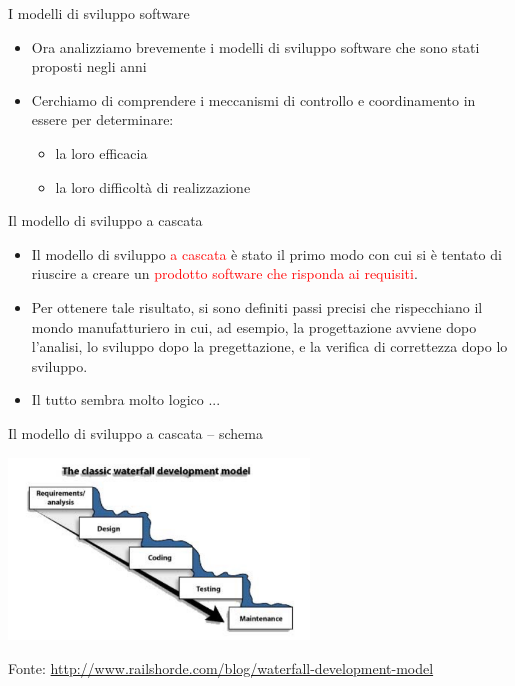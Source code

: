 \documentclass{beamer}
\begin{document}
\begin{frame}{\centerline{I modelli di sviluppo software}}

\begin{itemize}
\item Ora analizziamo brevemente i modelli di sviluppo software che sono stati proposti negli anni
\item Cerchiamo di comprendere i meccanismi di controllo e coordinamento in essere per determinare:
\begin{itemize}
\item la loro efficacia
\item la loro difficolt\`{a} di realizzazione 
\end{itemize}
\end{itemize}
\end{frame}


\begin{frame}{\centerline{Il modello di sviluppo a cascata}}


\begin{itemize}
    \item Il modello di sviluppo \textcolor{red}{a cascata} \`{e} stato il primo modo con cui si \`{e} tentato di riuscire a creare un \textcolor{red}{prodotto software che risponda ai requisiti}.
    \item Per ottenere tale risultato, si sono definiti passi precisi che rispecchiano il mondo manufatturiero in cui, ad esempio, la progettazione avviene dopo l'analisi, lo sviluppo dopo la pregettazione, e la verifica di correttezza dopo lo sviluppo.
\item Il tutto sembra molto logico ...
\end{itemize}


\end{frame}

\begin{frame}{\centerline{Il modello di sviluppo a cascata -- schema}}


\begin{center}
\includegraphics[width=80mm]{P2023.AIBCCSS.IlConcettoDiSoftware/img-02.png}
\end{center}
\vspace{0.5cm}

\begin{center}
\tiny
Fonte: \url{http://www.railshorde.com/blog/waterfall-development-model}

\end{center}
\end{frame}
\end{document}
